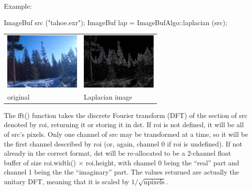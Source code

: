 \smallskip
\noindent Example:
\begin{code}
    ImageBuf src ("tahoe.exr");
    ImageBuf lap = ImageBufAlgo::laplacian (src);
\end{code}

\spc \begin{tabular}{ll}
\includegraphics[width=1.5in]{figures/tahoe-small.jpg} &
\includegraphics[width=1.5in]{figures/tahoe-laplacian.jpg} \\
original & Laplacian image \\
\end{tabular}
\apiend


 
 

The {\cf fft()} function takes the discrete Fourier transform (DFT) of
the section of {\cf src} denoted by {\cf roi}, returning it or storing it in {\cf dst}.
If {\cf roi} is not defined, it will be all of {\cf src}'s pixels.  Only
one channel of {\cf src} may be transformed at a time, so it will be the
first channel described by {\cf roi} (or, again, channel 0 if {\cf roi}
is undefined).  If not already in the correct format, {\cf dst} will be
re-allocated to be a 2-channel {\cf float} buffer of size
{\cf roi.width()} $\times$ {\cf roi.height}, with channel 0 being the
``real'' part and channel 1 being the the ``imaginary'' part.  The
values returned are actually the unitary DFT, meaning that it is scaled
by $1/\sqrt{\mathrm{npixels}}$.

